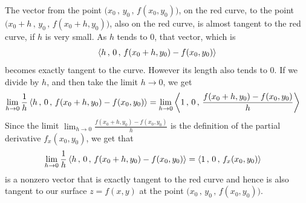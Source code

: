 The vector from the point $\big(x_0\,,\,y_0\,,\,f(x_0,y_0)\big)$, on the
red curve, to the point $\big(x_0+h\,,\,y_0\,,\,f(x_0+h,y_0)\big)$, 
also on the red curve, is almost tangent to the red curve, if 
$h$ is very small. As $h$ tends to $0$, that vector, which is
\begin{equation*}
\left< h\,,\, 0\,,\, f(x_0+h,y_0)-f(x_0,y_0)  \right>
\end{equation*}
becomes exactly tangent to the curve. However its length also tends
to $0$. If we divide by $h$, and then take the limit $h\rightarrow 0$,
we get
\begin{align*}
\lim_{h\rightarrow 0}\frac{1}{h} 
             \left< h\,,\, 0\,,\, f(x_0+h,y_0)-f(x_0,y_0)  \right>
&=\lim_{h\rightarrow 0} 
           \left< 1\,,\, 0\,,\, \frac{f(x_0+h,y_0)-f(x_0,y_0)}{h}  \right> 
\end{align*}
Since the limit $\lim_{h\rightarrow 0} \frac{f(x_0+h,y_0)-f(x_0,y_0)}{h}$
is the definition of the partial derivative $f_x(x_0,y_0)$, we get that
\begin{align*}
\lim_{h\rightarrow 0}\frac{1}{h} 
             \left< h\,,\, 0\,,\, f(x_0+h,y_0)-f(x_0,y_0)  \right>
&=\left< 1\,,\, 0\,,\, f_x(x_0,y_0)\right>
\end{align*}
is a nonzero vector that is exactly tangent to the red curve and
hence is also tangent to our surface $z=f(x,y)$ at the point 
$\big(x_0\,,\,y_0\,,\,f(x_0,y_0)\big)$. 

